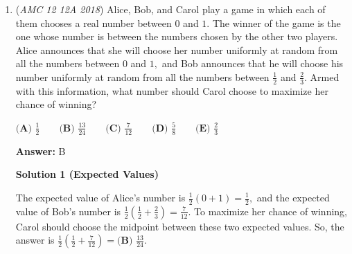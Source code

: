 \begin{enumerate}
 Now apply Menelaus' Theorem to $\triangle BAP$ with transversal $GMD$. Since $M$ is the midpoint of $\overline{PA}$, we have $PM=MA$, and since $AG=1$,
 \[\frac{PM}{MA}\cdot\frac{AG+GT+TB}{TB}\cdot\frac{DT}{DU+UP}=1.\]Because $PU=1$, this gives\[\frac{a+b+1}{b}\cdot\frac{c}{d+1}=1.\tag{2}\]

 From (1) and (2),
 \[(a+b)c=bd\]and
 \[(a+b+1)c=b(d+1).\]Subtracting the first equation from the second gives
 \[c=b.\]

 Hence $BT=DT$, so $\triangle BTD$ is isosceles.

 Since
 \[\angle PTA=180^\circ-36^\circ-56^\circ=88^\circ,\]and $TB$ is the extension of $TA$,
 \[\angle PTB=180^\circ-88^\circ=92^\circ.\]Therefore the two base angles of $\triangle BTD$ are
 \[\angle BDT=\angle TBD=\frac{180^\circ-92^\circ}{2}=44^\circ.\]

 Finally, since $\angle DPA=36^\circ$,
 \[\angle AMB=36^\circ+44^\circ=\boxed{80^\circ}.\]

 Therefore the answer is $\boxed{\textbf{(E)}\ 80}$.

 \href{https://artofproblemsolving.com/videos/amc/2018amc12a/473}{https://artofproblemsolving.com/videos/amc/2018amc12a/473}

 


	\item (\textit{AMC 12 12A 2018}) Alice, Bob, and Carol play a game in which each of them chooses a real number between $0$ and $1.$ The winner of the game is the one whose number is between the numbers chosen by the other two players. Alice announces that she will choose her number uniformly at random from all the numbers between $0$ and $1,$ and Bob announces that he will choose his number uniformly at random from all the numbers between $\frac{1}{2}$ and $\frac{2}{3}.$ Armed with this information, what number should Carol choose to maximize her chance of winning?


 $\textbf{(A) }\frac{1}{2}\qquad \textbf{(B) }\frac{13}{24} \qquad \textbf{(C) }\frac{7}{12} \qquad \textbf{(D) }\frac{5}{8} \qquad \textbf{(E) }\frac{2}{3}\qquad$

 \textbf{Answer: }B



\textbf{Solution 1 (Expected Values)}

The expected value of Alice's number is $\frac12\left(0+1\right)=\frac12,$ and the expected value of Bob's number is $\frac12\left(\frac12+\frac23\right)=\frac{7}{12}.$ To maximize her chance of winning, Carol should choose the midpoint between these two expected values. So, the answer is $\frac12\left(\frac12+\frac{7}{12}\right)=\boxed{\textbf{(B) }\frac{13}{24}}.$


\end{enumerate}
